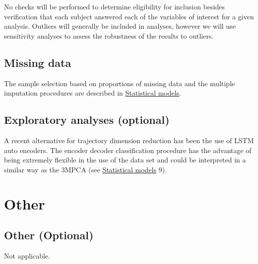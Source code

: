 \documentclass[]{article}
\begin{document}
No checks will be performed to determine eligibility for inclusion
besides verification that each subject answered each of the variables of
interest for a given analysis. Outliers will generally be included in
analyses, however we will use sensitivity analyses to assess the
robustness of the results to outliers.

\hypertarget{missing-data}{%
\subsection{Missing data}\label{missing-data}}

The sample selection based on proportions of missing data and the
multiple imputation procedures are described in
\protect\hyperlink{statistical-models}{Statistical models}.

\hypertarget{exploratory-analyses-optional}{%
\subsection{Exploratory analyses
(optional)}\label{exploratory-analyses-optional}}

A recent alternative for trajectory dimension reduction has been the use
of LSTM auto encoders. The encoder decoder classification procedure has
the advantage of being extremely flexible in the use of the data set and
could be interpreted in a similar way as the 3MPCA (see
\protect\hyperlink{statistical-models}{Statistical models} 9).

\hypertarget{other}{%
\section{Other}\label{other}}

\hypertarget{other-optional}{%
\subsection{Other (Optional)}\label{other-optional}}

Not applicable.

\hypertarget{section}{%
\subsection{}\label{section}}

\vspace{-2pc}
\setlength{\parindent}{-0.5in}
\setlength{\leftskip}{-1in}
\setlength{\parskip}{8pt}

\noindent


\end{document}
